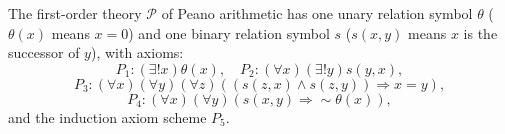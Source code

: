 The first-order theory $\mathcal{P}$ of Peano arithmetic has one unary relation symbol $\theta$ ($\theta(x)$ means $x = 0$) and one binary relation symbol $s$ ($s(x, y)$ means $x$ is the successor of $y$), with axioms:
$$P_1: (\exists!x)\theta(x), \quad P_2: (\forall x)(\exists!y)s(y, x),$$
$$P_3: (\forall x)(\forall y)(\forall z)((s(z, x) \wedge s(z, y)) \Rightarrow x = y),$$
$$P_4: (\forall x)(\forall y)(s(x, y) \Rightarrow \sim\theta(x)),$$
and the induction axiom scheme $P_5$.
